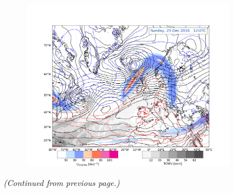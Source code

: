 \begin{figure}
\begin{subfigure}[b]{0.49\textwidth}
    \end{subfigure}
    \begin{subfigure}[b]{\textwidth}
        \includegraphics[trim={4.2cm 0cm 4.3cm 36.8cm},clip,
        width=\textwidth]{./fig_Geopot_Jet/20161225_12}
    \end{subfigure}
\caption{\textit{(Continued from previous page.)}}   
\end{figure}